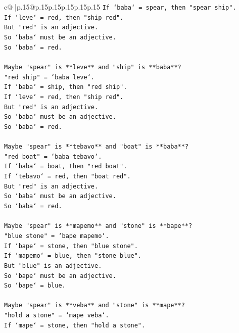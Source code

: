 \documentclass{article}
\begin{document}
{\begin{supertabular}{c@{$\;$}|p{.15\linewidth}@{}p{.15\linewidth}p{.15\linewidth}p{.15\linewidth}p{.15\linewidth}p{.15\linewidth}}
{{{\texttt{If `baba` = spear, then "spear ship".} \\
\texttt{If `leve` = red, then "ship red".} \\
\texttt{But "red" is an adjective.} \\
\texttt{So `baba` must be an adjective.} \\
\texttt{So `baba` = red.} \\
\\ 
\texttt{Maybe "spear" is **leve** and "ship" is **baba**?} \\
\texttt{"red ship" = `baba leve`.} \\
\texttt{If `baba` = ship, then "red ship".} \\
\texttt{If `leve` = red, then "ship red".} \\
\texttt{But "red" is an adjective.} \\
\texttt{So `baba` must be an adjective.} \\
\texttt{So `baba` = red.} \\
\\ 
\texttt{Maybe "spear" is **tebavo** and "boat" is **baba**?} \\
\texttt{"red boat" = `baba tebavo`.} \\
\texttt{If `baba` = boat, then "red boat".} \\
\texttt{If `tebavo` = red, then "boat red".} \\
\texttt{But "red" is an adjective.} \\
\texttt{So `baba` must be an adjective.} \\
\texttt{So `baba` = red.} \\
\\ 
\texttt{Maybe "spear" is **mapemo** and "stone" is **bape**?} \\
\texttt{"blue stone" = `bape mapemo`.} \\
\texttt{If `bape` = stone, then "blue stone".} \\
\texttt{If `mapemo` = blue, then "stone blue".} \\
\texttt{But "blue" is an adjective.} \\
\texttt{So `bape` must be an adjective.} \\
\texttt{So `bape` = blue.} \\
\\ 
\texttt{Maybe "spear" is **veba** and "stone" is **mape**?} \\
\texttt{"hold a stone" = `mape veba`.} \\
\texttt{If `mape` = stone, then "hold a stone".} \\
}}}
\end{supertabular}}
\end{document}
